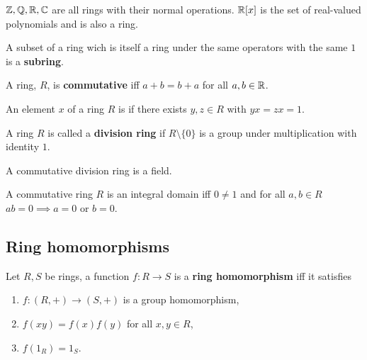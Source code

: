 \documentclass[../Year2.tex]{subfiles}
\begin{document}
\begin{examples}
    $\mathbb{Z},\mathbb{Q},\mathbb{R},\mathbb{C}$ are all rings with their normal operations. $\mathbb{R}[x]$ is the set of real-valued polynomials and is also a ring.
\end{examples}

\begin{definition}[Subring]
    A subset of a ring wich is itself a ring under the same operators with the same $1$ is a \textbf{subring}.
\end{definition}

\begin{definition}
    A ring, $R$, is \textbf{commutative} iff $a+b=b+a$ for all $a,b\in\mathbb{R}$.
\end{definition}

\begin{definition}[Invertible]
    An element $x$ of a ring $R$ is  if there exists $y,z\in R$ with $yx=zx=1$.
\end{definition}

\begin{definition}
    A ring $R$ is called a \textbf{division ring} if $R\setminus\{0\}$ is a group under multiplication with identity $1$.
\end{definition}

\begin{remark}
    A commutative division ring is a field.
\end{remark}

\begin{definition}
    A commutative ring $R$ is an integral domain iff $0\neq1$ and for all $a,b\in R$ $ab=0\implies a=0$ or $b=0$.
\end{definition}

\subsection{Ring homomorphisms}

\begin{definition}
    Let $R,S$ be rings, a function $f:R\rightarrow S$ is a \textbf{ring homomorphism} iff it satisfies \begin{enumerate}
        \item $f:(R,+)\rightarrow (S,+)$ is a group homomorphism,
        \item $f(xy)=f(x)f(y)$ for all $x,y\in R$,
        \item $f(1_R)=1_S$.
    \end{enumerate}
\end{definition}
\end{document}
